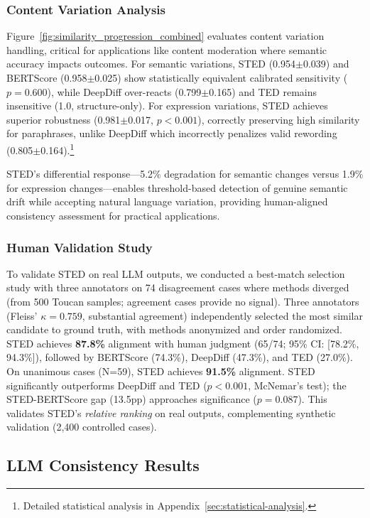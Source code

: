 \documentclass{article}
\theoremstyle{plain}
\theoremstyle{definition}
\begin{document}
\subsubsection{Content Variation Analysis}
Figure~\ref{fig:similarity_progression_combined} evaluates content variation handling, critical for applications like content moderation where semantic accuracy impacts outcomes. For semantic variations, STED (0.954$\pm$0.039) and BERTScore (0.958$\pm$0.025) show statistically equivalent calibrated sensitivity ($p = 0.600$), while DeepDiff over-reacts (0.799$\pm$0.165) and TED remains insensitive (1.0, structure-only). For expression variations, STED achieves superior robustness (0.981$\pm$0.017, $p < 0.001$), correctly preserving high similarity for paraphrases, unlike DeepDiff which incorrectly penalizes valid rewording (0.805$\pm$0.164).\footnote{Detailed statistical analysis in Appendix~\ref{sec:statistical-analysis}.}

STED's differential response---5.2\% degradation for semantic changes versus 1.9\% for expression changes---enables threshold-based detection of genuine semantic drift while accepting natural language variation, providing human-aligned consistency assessment for practical applications.

\subsubsection{Human Validation Study}
\label{sec:human-validation}

To validate STED on real LLM outputs, we conducted a best-match selection study with three annotators on 74 disagreement cases where methods diverged (from 500 Toucan samples; agreement cases provide no signal). Three annotators (Fleiss' $\kappa = 0.759$, substantial agreement) independently selected the most similar candidate to ground truth, with methods anonymized and order randomized. STED achieves \textbf{87.8\%} alignment with human judgment (65/74; 95\% CI: [78.2\%, 94.3\%]), followed by BERTScore (74.3\%), DeepDiff (47.3\%), and TED (27.0\%). On unanimous cases (N=59), STED achieves \textbf{91.5\%} alignment. STED significantly outperforms DeepDiff and TED ($p < 0.001$, McNemar's test); the STED-BERTScore gap (13.5pp) approaches significance ($p = 0.087$). This validates STED's \textit{relative ranking} on real outputs, complementing synthetic validation (2,400 controlled cases).

\subsection{LLM Consistency Results}
\end{document}
